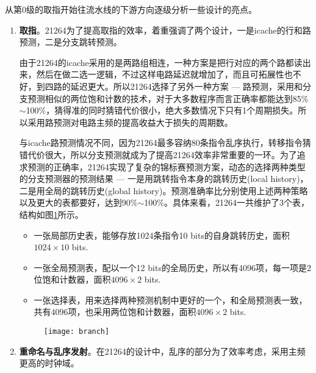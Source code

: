 从第0级的取指开始往流水线的下游方向逐级分析一些设计的亮点。
\begin{enumerate}[label=(\alph*)]
	\item \textbf{取指}。21264为了提高取指的效率，着重强调了两个设计，一是icache的行和路预测，二是分支跳转预测。
	
	由于21264的icache采用的是两路组相连，一种方案是把行对应的两个路都读出来，然后在做二选一逻辑，不过这样电路延迟就增加了，而且可拓展性也不好，到四路的延迟更大。所以21264选择了另外一种方案 --- 路预测，采用和分支预测相似的两位饱和计数的技术，对于大多数程序而言正确率都能达到85\%$ \sim $100\%，猜得准的同时猜错代价很小，绝大多数情况下只有1个周期\citep{Alpha21264}损失。所以采用路预测对电路主频的提高收益大于损失的周期数。
	
	与icache路预测情况不同，因为21264最多容纳80条指令乱序执行，转移指令猜错代价很大，所以分支预测就成为了提高21264效率非常重要的一环。为了追求预测的正确率，21264实现了复杂的锦标赛预测方案，动态的选择两种类型的分支预测器的预测结果 --- 一是用跳转指令本身的跳转历史(local history)，二是用全局的跳转历史(global history)。预测准确率比分别使用上述两种策略以及更大的表都要好，达到90\%$ \sim $100\%\citep{Alpha21264}。具体来看，21264一共维护了3个表，结构如图\ref{fig:branch_21264}所示。
	\begin{itemize}
		\item 一张局部历史表，能够存放1024条指令10 bits的自身跳转历史，面积$ 1024\times 10 $ bits.
		\item 一张全局预测表，配以一个12 bits的全局历史，所以有4096项，每一项是2位饱和计数器，面积$ 4096\times 2 $ bits.
		\item 一张选择表，用来选择两种预测机制中更好的一个，和全局预测表一致，共有4096项，也采用两位饱和计数器，面积$ 4096\times 2 $ bits.
	\end{itemize}
	\begin{figure}[!htbp]
		\centering
		\texttt{[image: branch]}
		\label{fig:branch_21264}
	\end{figure}
	\item \textbf{重命名与乱序发射}。在21264的设计中，乱序的部分为了效率考虑，采用主频更高的时钟域。
	

\end{enumerate}
